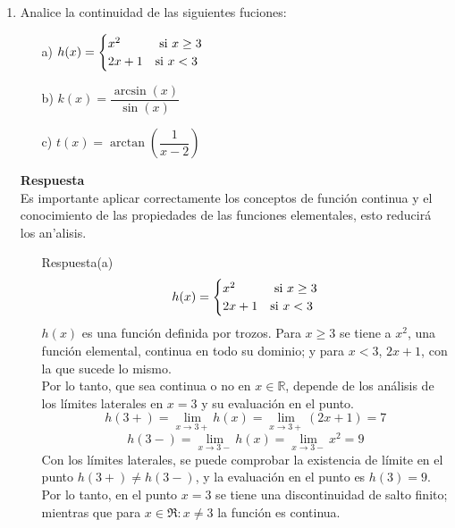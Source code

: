 \documentclass[10pt,twoside]{SelfArx} %
\begin{document}
\begin{enumerate}
\begin{enumerate}
	\item[Respuesta(c)]
	\[ \lim\limits_{x\rightarrow0}\frac{x^{2}-1}{2x^{2}-x-1} \]
	aplicando propiedades de los límites
	\[ \lim\limits_{x\rightarrow0}\frac{x^{2}-1}{2x^{2}-x-1}=\frac{\lim\limits_{x\rightarrow0}(x^{2}-1)}{\lim\limits_{x\rightarrow0}(2x^{2}-x-1)} \]
	\[ =\frac{\lim\limits_{x\rightarrow0}x^{2}-\lim\limits_{x\rightarrow0}1}{\lim\limits_{x\rightarrow0}2x^{2}-\lim\limits_{x\rightarrow0}x-\lim\limits_{x\rightarrow0}1}
	=\dfrac{-1}{-1}=1 \]
\end{enumerate}
	\item	Analice la continuidad de las siguientes fuciones: %
			\begin{enumerate}
				\item[a)]	$ h(x)=\begin{cases}
				x^{2} & \hbox{ si $ x\geq3 $}\\
				2x+1 & \hbox{si $ x<3 $}
				\end{cases} $
				\item[b)]	$ k(x)=\dfrac{\arcsin(x)}{\sin(x)} $
				\item[c)]	$ t(x)=\arctan(\dfrac{1}{x-2}) $
			\end{enumerate}
\textbf{Respuesta}			%
\\
Es importante aplicar correctamente los conceptos de funci\'on continua y el conocimiento de las propiedades de las funciones elementales, esto reducir\'a los an'alisis.
\begin{enumerate}
	\item[Respuesta(a)]	
	\[ h(x)=\begin{cases}
	x^{2} & \hbox{ si $ x\geq3 $}\\
	2x+1 & \hbox{si $ x<3 $}
	\end{cases} \]
	$ h(x) $ es una función definida por trozos. Para $ x\geq3 $ se tiene a $ x^{2} $, una función elemental, continua en todo su dominio; y para $ x<3 $, $ 2x+1 $, con la que sucede lo mismo. \\
	Por lo tanto, que sea continua o no en $ x\in\mathbb{R} $, depende de los an\'alisis de los l\'imites laterales en $ x=3 $ y su evaluaci\'on en el punto.\\
	\[ h(3+)=\lim\limits_{x\rightarrow3+}h(x)=\lim\limits_{x\rightarrow3+}(2x+1)=7 \]
	\[ h(3-)=\lim\limits_{x\rightarrow3-}h(x)=\lim\limits_{x\rightarrow3-}x^{2}=9 \]
	Con los límites laterales, se puede comprobar la existencia de límite en el punto $ h(3+)\neq h(3-) $,  y la evaluaci\'on en el punto es $ h(3)=9 $.\\
	Por lo tanto, en el punto $ x=3 $ se tiene una discontinuidad de salto finito; mientras que para $ {x\in\Re: x\neq3} $ la función es continua.
	

\end{enumerate}
\end{enumerate}
\end{document}
